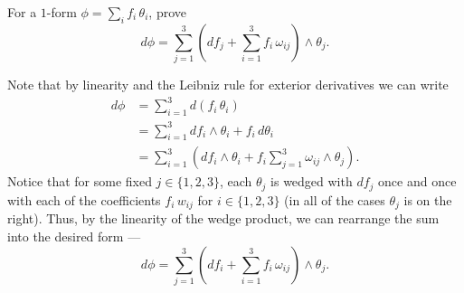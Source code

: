 \documentclass[12 pt, letterpaper]{hmcpset}
\begin{document}
\pagebreak

\begin{problem}[Problem 5.]
	For a $1$-form $\phi = \sum_{i} f_{i} \, \theta_{i}$, prove
	\[
		d \phi = \sum_{j = 1}^{3} \left ( df_{j} + \sum_{i = 1}^{3} f_{i} \, \omega_{ij} \right ) \wedge \theta_{j}.
	\]
\end{problem}

\begin{solution}
	Note that by linearity and the Leibniz rule for exterior derivatives we can write
	\[
		\begin{split}
			d \phi & = \sum_{i = 1}^{3} d(f_{i} \, \theta_{i}) \\
			       & = \sum_{i = 1}^{3} df_{i} \wedge \theta_{i} + f_{i} \, d\theta_{i} \\
			       & = \sum_{i = 1}^{3} \left ( df_{i} \wedge \theta_{i} + f_{i} \sum_{j = 1}^{3} \omega_{ij} \wedge \theta_{j} \right ).
		\end{split}
	\]
	Notice that for some fixed $j \in \{ 1, 2, 3 \}$, each $\theta_{j}$ is wedged with $df_{j}$ once and once with each of the coefficients $f_{i} \, w_{ij}$ for $i \in \{ 1, 2, 3 \}$ (in all of the cases $\theta_{j}$ is on the right). Thus, by the linearity of the wedge product, we can rearrange the sum into the desired form ---
	\[
		d \phi = \sum_{j = 1}^{3} \left ( df_{i} + \sum_{i = 1}^{3} f_{i} \, \omega_{ij} \right ) \wedge \theta_{j}.
	\]
\end{solution}
\end{document}
